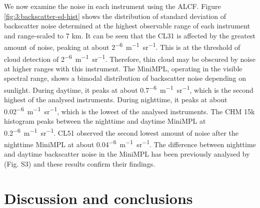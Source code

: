 We now examine the noise in each instrument using the ALCF.
Figure \ref{fig:3:backscatter-sd-hist} shows the distribution of standard
deviation of backscatter noise determined at the highest observable range of each instrument
and range-scaled
to 7 km. It can be seen that the CL31 is affected by the greatest amount of noise,
peaking at about 2\unit{^{-6}m^{-1}sr^{-1}}. This is at the
threshold of cloud detection of 2\unit{^{-6}m^{-1}sr^{-1}}. Therefore,
thin cloud may be obscured by noise at higher ranges with this instrument. The MiniMPL,
operating in the visible spectral range, shows a bimodal distribution of
backscatter noise depending on sunlight. During daytime, it peaks at
about 0.7\unit{^{-6}m^{-1}sr^{-1}}, which is the second highest
of the analysed instruments. During nighttime, it peaks at about
0.02\unit{^{-6}m^{-1}sr^{-1}}, which is the lowest of the analysed
instruments. The CHM 15k histogram peaks between the nighttime and daytime MiniMPL at 0.2\unit{^{-6}m^{-1}sr^{-1}}.
CL51 observed the second lowest amount
of noise after the nighttime MiniMPL at about 0.04\unit{^{-6}m^{-1}sr^{-1}}.
The difference between nighttime and daytime backscatter noise in the MiniMPL
has been previously analysed by \cite{silber2018} (Fig. S3) and these results confirm their findings.

\section{Discussion and conclusions}
\label{sec:3:conclusions}


